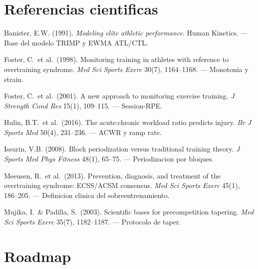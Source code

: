 \documentclass[12pt, a4paper]{article}
\begin{document}
\section{Referencias cientificas}

\begin{description}[leftmargin=0pt, style=nextline]
  \item[Banister 1991]
    Banister, E.W. (1991). \textit{Modeling elite athletic performance}.
    Human Kinetics. --- Base del modelo TRIMP y EWMA ATL/CTL.

  \item[Foster 1998]
    Foster, C.\ et al.\ (1998). Monitoring training in athletes with reference to overtraining
    syndrome. \textit{Med Sci Sports Exerc} 30(7), 1164--1168.
    --- Monotonia y strain.

  \item[Foster 2001]
    Foster, C.\ et al.\ (2001). A new approach to monitoring exercise training.
    \textit{J Strength Cond Res} 15(1), 109--115. --- Session-RPE.

  \item[Hulin 2016]
    Hulin, B.T.\ et al.\ (2016). The acute:chronic workload ratio predicts injury.
    \textit{Br J Sports Med} 50(4), 231--236. --- ACWR y ramp rate.

  \item[Issurin 2008]
    Issurin, V.B. (2008). Block periodization versus traditional training theory.
    \textit{J Sports Med Phys Fitness} 48(1), 65--75. --- Periodizacion por bloques.

  \item[Meeusen 2013]
    Meeusen, R.\ et al.\ (2013). Prevention, diagnosis, and treatment of the overtraining
    syndrome: ECSS/ACSM consensus. \textit{Med Sci Sports Exerc} 45(1), 186--205.
    --- Definicion clinica del sobreentrenamiento.

  \item[Mujika 2003]
    Mujika, I.\ \& Padilla, S.\ (2003). Scientific bases for precompetition tapering.
    \textit{Med Sci Sports Exerc} 35(7), 1182--1187. --- Protocolo de taper.
\end{description}

\section{Roadmap}
\end{document}
